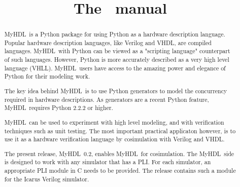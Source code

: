 \documentclass{manual}
\title{The \myhdl\ manual}
\newcommand{\myhdl}{{MyHDL}}
\begin{document}
\maketitle



\begin{abstract}

\noindent

\myhdl\ is a Python package for using Python as a hardware description
language. Popular hardware description languages, like Verilog and
VHDL, are compiled languages. \myhdl\ with Python can be viewed as a
"scripting language" counterpart of such languages. However, Python is
more accurately described as a very high level language
(VHLL). \myhdl\ users have access to the amazing power and elegance of
Python for their modeling work.

The key idea behind \myhdl\ is to use Python generators to model the
concurrency required in hardware descriptions. As generators are a
recent Python feature, \myhdl\ requires Python 2.2.2 or higher.

\myhdl\ can be used to experiment with high level modeling, and with
verification techniques such as unit testing. The most important
practical applicaton however, is to use it as a hardware verification
language by cosimulation with Verilog and VHDL.

The present release, \myhdl\ 0.2, enables \myhdl\ for
cosimulation. The \myhdl\ side is designed to work with any simulator
that has a PLI. For each simulator, an appropriate PLI module in C
needs to be provided. The release contains such a module for the
Icarus Verilog simulator.


\end{abstract}

\tableofcontents







\end{document}
